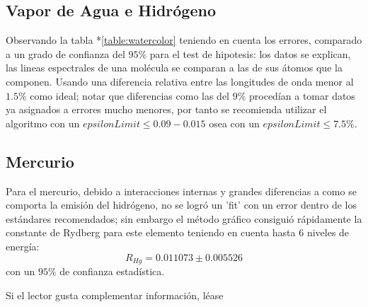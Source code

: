 \documentclass[a4paper,twocolumn,10pt]{article}
\begin{document}
\subsection{Vapor de Agua e Hidrógeno}
Observando la tabla *\ref{table:watercolor}
teniendo en cuenta los errores, comparado a un grado de confianza del $95\%$ para el test de hipotesis: los datos se explican, las lineas espectrales de una molécula se comparan a las de sus átomos que la componen. Usando una diferencia relativa entre las longitudes de onda menor al $1.5\%$ como ideal; notar que diferencias como las del $9\%$ procedían a tomar datos ya asignados a errores mucho menores, por tanto se recomienda utilizar el algoritmo \cite{github} con un $epsilonLimit \leq 0.09 - 0.015$ osea con un $epsilonLimit \leq 7.5 \%$.


\subsection{Mercurio}
Para el mercurio, debido a interacciones internas y grandes diferencias a como se comporta la emisión del hidrógeno, no se logró un 'fit' con un error dentro de los estándares recomendados; sin embargo el método gráfico consiguió rápidamente la constante de Rydberg para este elemento teniendo en cuenta hasta 6 niveles de energía:
 $$ R_{Hg} = 0.011073 \pm 0.005526 $$ con un $95\%$ de confianza estadística.

Si el lector gusta complementar información, léase \cite{thornton}

\medskip

\printbibliography
\end{document}
